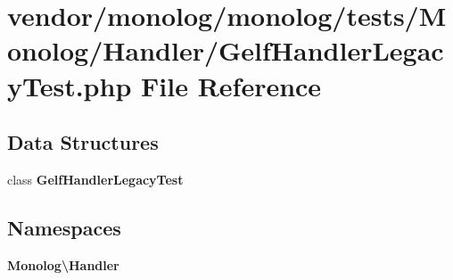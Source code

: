 \section{vendor/monolog/monolog/tests/\+Monolog/\+Handler/\+Gelf\+Handler\+Legacy\+Test.php File Reference}
\label{_gelf_handler_legacy_test_8php}
\subsection*{Data Structures}
\begin{DoxyCompactItemize}
\item 
class {\bf Gelf\+Handler\+Legacy\+Test}
\end{DoxyCompactItemize}
\subsection*{Namespaces}
\begin{DoxyCompactItemize}
\item 
 {\bf Monolog\textbackslash{}\+Handler}
\end{DoxyCompactItemize}
